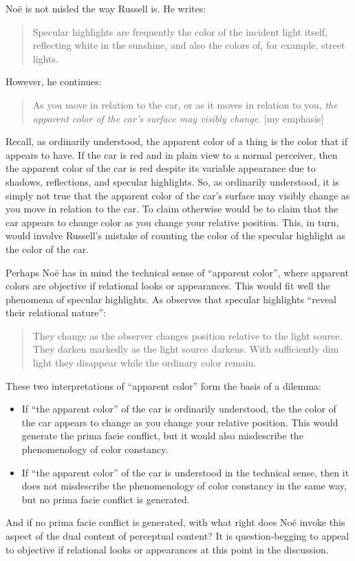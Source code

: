 \documentclass[12pt]{article}
\begin{document}
Noë is not misled the way Russell is. He writes:
	\begin{quote}
		Specular highlights are frequently the color of the incident light itself, reflecting white in the sunshine, and also the colors of, for example, street lights. \citep[125]{Noe:2004fk}
	\end{quote}
However, he continues:
	\begin{quote}
		As you move in relation to the car, or as it moves in relation to you, \emph{the apparent color of the car's surface may visibly change}. [my emphasis] \citep[125]{Noe:2004fk}
	\end{quote}
Recall, as ordinarily understood, the apparent color of a thing is the color that if appears to have. If the car is red and in plain view to a normal perceiver, then the apparent color of the car is red despite its variable appearance due to shadows, reflections, and specular highlights. So, as ordinarily understood, it is simply not true that the apparent color of the car's surface may visibly change as you move in relation to the car. To claim otherwise would be to claim that the car appears to change color as you change your relative position. This, in turn, would involve Russell's mistake of counting the color of the specular highlight as the color of the car. 

Perhaps Noë has in mind the technical sense of ``apparent color'', where apparent colors are objective if relational looks or appearances. This would fit well the phenomena of specular highlights. As \citet[141]{Johnston:1992ck} observes that specular highlights ``reveal their relational nature'':
	\begin{quote}
		They change as the observer changes position relative to the light source. They darken markedly as the light source darkens. With sufficiently dim light they disappear while the ordinary color remain.
	\end{quote}

	These two interpretations of ``apparent color'' form the basis of a dilemma:
	\begin{itemize}
		\item If ``the apparent color'' of the car is ordinarily understood, the the color of the car appears to change as you change your relative position. This would generate the prima facie conflict, but it would also misdescribe the phenomenology of color constancy. 
		\item If ``the apparent color'' of the car is understood in the technical sense, then it does not misdescribe the phenomenology of color constancy in the same way, but no prima facie conflict is generated. 
	\end{itemize}
And if no prima facie conflict is generated, with what right does Noë invoke this aspect of the dual content of perceptual content? It is question-begging to appeal to objective if relational looks or appearances at this point in the discussion.
\end{document}
